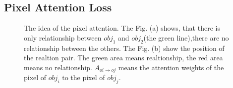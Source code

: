 \subsection{Pixel  Attention Loss}

\begin{figure}[htbp]
	\centering
	\caption[The idea of the pixel attention loss]{The idea of the pixel attention. The Fig. (a) shows, that there is only relationship between $obj_1$ and $obj_2$(the green line),there are no relationship between the others. The Fig. (b) show the position of the realtion pair. The green area means realtionship, the red area means no relationship. $A_{oi \to oj}$ means the attention weights of the pixel of $obj_i$ to  the pixel of $obj_j$.}
	\label{fig:idea_pixelloss}
\end{figure}

